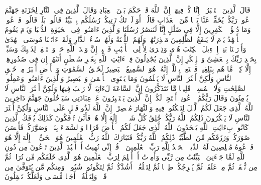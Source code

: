 \stopbuffer%
\startbuffer[\q:40:48]
قَالَ ٱلَّذِینَ ٱسۡتَكۡبَرُوۤا۟ إِنَّا كُلࣱّ فِیهَاۤ إِنَّ ٱللَّهَ قَدۡ حَكَمَ بَیۡنَ ٱلۡعِبَادِ%
\stopbuffer%
\startbuffer[\q:40:49]
وَقَالَ ٱلَّذِینَ فِی ٱلنَّارِ لِخَزَنَةِ جَهَنَّمَ ٱدۡعُوا۟ رَبَّكُمۡ یُخَفِّفۡ عَنَّا یَوۡمࣰا مِّنَ ٱلۡعَذَابِ%
\stopbuffer%
\startbuffer[\q:40:50]
قَالُوۤا۟ أَوَ لَمۡ تَكُ تَأۡتِیكُمۡ رُسُلُكُم بِٱلۡبَیِّنَٰتِۖ قَالُوا۟ بَلَىٰۚ قَالُوا۟ فَٱدۡعُوا۟ۗ وَمَا دُعَٰۤؤُا۟ ٱلۡكَٰفِرِینَ إِلَّا فِی ضَلَٰلٍ%
\stopbuffer%
\startbuffer[\q:40:51]
إِنَّا لَنَنصُرُ رُسُلَنَا وَٱلَّذِینَ ءَامَنُوا۟ فِی ٱلۡحَیَوٰةِ ٱلدُّنۡیَا وَیَوۡمَ یَقُومُ ٱلۡأَشۡهَٰدُ%
\stopbuffer%
\startbuffer[\q:40:52]
یَوۡمَ لَا یَنفَعُ ٱلظَّٰلِمِینَ مَعۡذِرَتُهُمۡۖ وَلَهُمُ ٱللَّعۡنَةُ وَلَهُمۡ سُوۤءُ ٱلدَّارِ%
\stopbuffer%
\startbuffer[\q:40:53]
وَلَقَدۡ ءَاتَیۡنَا مُوسَى ٱلۡهُدَىٰ وَأَوۡرَثۡنَا بَنِیۤ إِسۡرَٰۤءِیلَ ٱلۡكِتَٰبَ%
\stopbuffer%
\startbuffer[\q:40:54]
هُدࣰى وَذِكۡرَىٰ لِأُو۟لِی ٱلۡأَلۡبَٰبِ%
\stopbuffer%
\startbuffer[\q:40:55]
فَٱصۡبِرۡ إِنَّ وَعۡدَ ٱللَّهِ حَقࣱّ وَٱسۡتَغۡفِرۡ لِذَنۢبِكَ وَسَبِّحۡ بِحَمۡدِ رَبِّكَ بِٱلۡعَشِیِّ وَٱلۡإِبۡكَٰرِ%
\stopbuffer%
\startbuffer[\q:40:56]
إِنَّ ٱلَّذِینَ یُجَٰدِلُونَ فِیۤ ءَایَٰتِ ٱللَّهِ بِغَیۡرِ سُلۡطَٰنٍ أَتَىٰهُمۡ إِن فِی صُدُورِهِمۡ إِلَّا كِبۡرࣱ مَّا هُم بِبَٰلِغِیهِۚ فَٱسۡتَعِذۡ بِٱللَّهِۖ إِنَّهُۥ هُوَ ٱلسَّمِیعُ ٱلۡبَصِیرُ%
\stopbuffer%
\startbuffer[\q:40:57]
لَخَلۡقُ ٱلسَّمَٰوَٰتِ وَٱلۡأَرۡضِ أَكۡبَرُ مِنۡ خَلۡقِ ٱلنَّاسِ وَلَٰكِنَّ أَكۡثَرَ ٱلنَّاسِ لَا یَعۡلَمُونَ%
\stopbuffer%
\startbuffer[\q:40:58]
وَمَا یَسۡتَوِی ٱلۡأَعۡمَىٰ وَٱلۡبَصِیرُ وَٱلَّذِینَ ءَامَنُوا۟ وَعَمِلُوا۟ ٱلصَّٰلِحَٰتِ وَلَا ٱلۡمُسِیۤءُۚ قَلِیلࣰا مَّا تَتَذَكَّرُونَ%
\stopbuffer%
\startbuffer[\q:40:59]
إِنَّ ٱلسَّاعَةَ لَءَاتِیَةࣱ لَّا رَیۡبَ فِیهَا وَلَٰكِنَّ أَكۡثَرَ ٱلنَّاسِ لَا یُؤۡمِنُونَ%
\stopbuffer%
\startbuffer[\q:40:60]
وَقَالَ رَبُّكُمُ ٱدۡعُونِیۤ أَسۡتَجِبۡ لَكُمۡۚ إِنَّ ٱلَّذِینَ یَسۡتَكۡبِرُونَ عَنۡ عِبَادَتِی سَیَدۡخُلُونَ جَهَنَّمَ دَاخِرِینَ%
\stopbuffer%
\startbuffer[\q:40:61]
ٱللَّهُ ٱلَّذِی جَعَلَ لَكُمُ ٱلَّیۡلَ لِتَسۡكُنُوا۟ فِیهِ وَٱلنَّهَارَ مُبۡصِرًاۚ إِنَّ ٱللَّهَ لَذُو فَضۡلٍ عَلَى ٱلنَّاسِ وَلَٰكِنَّ أَكۡثَرَ ٱلنَّاسِ لَا یَشۡكُرُونَ%
\stopbuffer%
\startbuffer[\q:40:62]
ذَٰلِكُمُ ٱللَّهُ رَبُّكُمۡ خَٰلِقُ كُلِّ شَیۡءࣲ لَّاۤ إِلَٰهَ إِلَّا هُوَۖ فَأَنَّىٰ تُؤۡفَكُونَ%
\stopbuffer%
\startbuffer[\q:40:63]
كَذَٰلِكَ یُؤۡفَكُ ٱلَّذِینَ كَانُوا۟ بِءَایَٰتِ ٱللَّهِ یَجۡحَدُونَ%
\stopbuffer%
\startbuffer[\q:40:64]
ٱللَّهُ ٱلَّذِی جَعَلَ لَكُمُ ٱلۡأَرۡضَ قَرَارࣰا وَٱلسَّمَاۤءَ بِنَاۤءࣰ وَصَوَّرَكُمۡ فَأَحۡسَنَ صُوَرَكُمۡ وَرَزَقَكُم مِّنَ ٱلطَّیِّبَٰتِۚ ذَٰلِكُمُ ٱللَّهُ رَبُّكُمۡۖ فَتَبَارَكَ ٱللَّهُ رَبُّ ٱلۡعَٰلَمِینَ%
\stopbuffer%
\startbuffer[\q:40:65]
هُوَ ٱلۡحَیُّ لَاۤ إِلَٰهَ إِلَّا هُوَ فَٱدۡعُوهُ مُخۡلِصِینَ لَهُ ٱلدِّینَۗ ٱلۡحَمۡدُ لِلَّهِ رَبِّ ٱلۡعَٰلَمِینَ%
\stopbuffer%
\startbuffer[\q:40:66]
۞ قُلۡ إِنِّی نُهِیتُ أَنۡ أَعۡبُدَ ٱلَّذِینَ تَدۡعُونَ مِن دُونِ ٱللَّهِ لَمَّا جَاۤءَنِیَ ٱلۡبَیِّنَٰتُ مِن رَّبِّی وَأُمِرۡتُ أَنۡ أُسۡلِمَ لِرَبِّ ٱلۡعَٰلَمِینَ%
\stopbuffer%
\startbuffer[\q:40:67]
هُوَ ٱلَّذِی خَلَقَكُم مِّن تُرَابࣲ ثُمَّ مِن نُّطۡفَةࣲ ثُمَّ مِنۡ عَلَقَةࣲ ثُمَّ یُخۡرِجُكُمۡ طِفۡلࣰا ثُمَّ لِتَبۡلُغُوۤا۟ أَشُدَّكُمۡ ثُمَّ لِتَكُونُوا۟ شُیُوخࣰاۚ وَمِنكُم مَّن یُتَوَفَّىٰ مِن قَبۡلُۖ وَلِتَبۡلُغُوۤا۟ أَجَلࣰا مُّسَمࣰّى وَلَعَلَّكُمۡ تَعۡقِلُونَ%
\stopbuffer%

